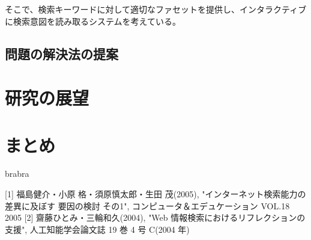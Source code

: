 \documentclass[a4j,10pt, twocolumn]{jarticle}
\begin{document}
そこで、検索キーワードに対して適切なファセットを提供し、インタラクティブに検索意図を読み取るシステムを考えている。
\subsection{問題の解決法の提案}
\section{研究の展望}

\section{まとめ}
brabra
\begin{thebibliography}{3}
 \label{takada}
  [1] 福島健介・小原 格・須原慎太郎・生田 茂(2005), "インターネット検索能力の差異に及ぼす 要因の検討 その1", コンピュータ＆エデュケーション VOL.18 2005
  [2] 齋藤ひとみ・三輪和久(2004),  "Web 情報検索におけるリフレクションの支援", 人工知能学会論文誌 19 巻 4 号 C(2004 年)
\end{thebibliography}
\end{document}
